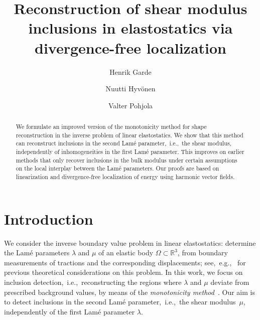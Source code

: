 \documentclass[reqno]{amsart}
\numberwithin{equation}{section}
\numberwithin{figure}{section}
\numberwithin{table}{section}
\newcommand{\R}{\mathbb{R}}
\theoremstyle{definition}
\theoremstyle{plain}
\theoremstyle{definition}
\theoremstyle{remark}
\numberwithin{equation}{section}
\begin{document}
\title[Reconstruction of shear modulus inclusions]{Reconstruction of shear modulus inclusions in elastostatics via divergence-free localization}
\date{}

\author[H.~Garde]{Henrik Garde}
\address[H.~Garde]{Department of Mathematics, Aarhus University, Aarhus, Denmark.}

\author[N.~Hyv\"onen]{Nuutti Hyv\"onen}
\address[N.~Hyv\"onen]{Department of Mathematics and Systems Analysis, Aalto University, Helsinki, Finland.}

\author[V.~Pohjola]{Valter Pohjola}
\address[V.~Pohjola]{Applied and Computational Mathematics, University of Oulu, Oulu, Finland}

\begin{abstract}
	We formulate an improved version of the monotonicity method for shape reconstruction in the inverse problem of linear elastostatics. We show that this method can reconstruct inclusions in the second Lam\'e parameter,~i.e.,~the shear modulus, independently of inhomogeneities in the first Lam\'e parameter. This improves on earlier methods that only recover inclusions in the bulk modulus under certain assumptions on the local interplay between the Lam\'e parameters.  Our proofs are based on linearization and divergence-free localization of energy using harmonic vector fields.
\end{abstract}

\maketitle
\tableofcontents

\section{Introduction} 

We consider the inverse boundary value problem in linear elastostatics: determine the Lam\'e parameters $\lambda$ and $\mu$ of an elastic body $\Omega \subset \R^3$, from boundary measurements of tractions and the corresponding displacements; see,~e.g.,~\cite{Barbone04, Beretta14a, Beretta14b, Carstea18, Eskin02, Ikehata90, Ikehata06, Ikehata99, Imanuvilov11,Lin17,Nakamura99,Nakamura93,Nakamura94,Nakamura94erratum,Nakamura95} for previous theoretical considerations on this problem. In this work, we focus on inclusion detection,~i.e.,~reconstructing the regions where $\lambda$ and $\mu$ deviate from prescribed background values, by means of the \emph{monotonicity method}~\cite{Tamburrino02,Harrach2008,HU13,Garde2020}. Our aim is to detect inclusions in the second Lam\'e parameter,~i.e.,~the shear modulus~$\mu$, independently of the first Lam\'e parameter $\lambda$. 
\end{document}
